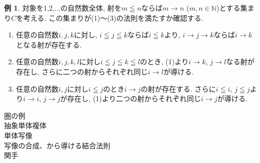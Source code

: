 \documentclass{article}
\theoremstyle{definition}
\newtheorem{exam}[dfn]{例}
\begin{document}
\begin{exam}
対象を1,2,...の自然数全体, 射を$m\leqq n$ならば$m \rightarrow n$ ($m, n \in \mathbb{N}$)とする集まり$C$を考える. この集まりが(1)～(3)の法則を満たすか確認する. 
 \begin{enumerate}[(1)]
        \item 任意の自然数$i, j, k$に対し, $i\leqq j\leqq k$ならば$i\leqq k$より, $i\rightarrow j\rightarrow k$ならば$i\rightarrow k$となる射が存在する.
        \item 任意の自然数$i, j, k, l$に対し$i\leqq j\leqq k\leqq l$のとき, (1)より$i\rightarrow k$, $j \rightarrow l$なる射が存在し, さらに二つの射からそれぞれ同じ$i\rightarrow l$が導ける.
        \item 任意の自然数$i, j$に対し$i\leqq j$のとき$i\rightarrow j$の射が存在する. さらに$i\leqq i$, $j\leqq j$より$i\rightarrow i$, $j\rightarrow j$が存在し, (1)より二つの射からそれぞれ同じ$i\rightarrow j$が導ける.
\end{enumerate}

\end{exam}
圏の例\\
抽象単体複体\\
単体写像\\
写像の合成、から導ける結合法則\\
関手\\
\end{document}
